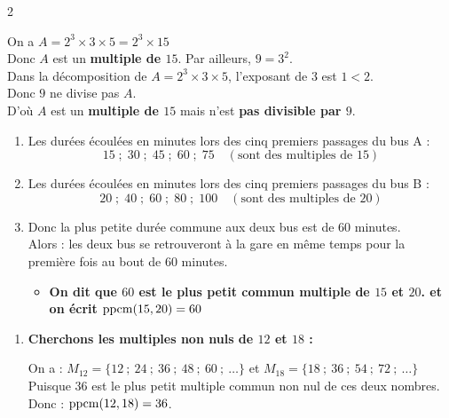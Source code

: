 \documentclass[10pt, a4paper]{article}
\begin{document}
\begin{multicols*}{2}
\begin{Solution}[APPLICATION][9]
\begin{enumerate}[leftmargin=*,itemsep=0.5pt]
    On a $A = 2^3 \times 3 \times 5 = 2^3 \times 15$ \\
    Donc $A$ est un \textbf{multiple de $15$}. Par ailleurs, $9 = 3^2$. \\
    Dans la décomposition de $A = 2^3 \times 3 \times 5$, l'exposant de $3$ est $1 < 2$. \\
    Donc $9$ ne divise pas $A$. \\
    D'où $A$ est un \textbf{multiple de $15$} mais n'est \textbf{pas divisible par $9$}.
\end{enumerate}
\end{Solution}

\begin{Solution}[ACTIVITÉ][4]
\begin{enumerate}[leftmargin=*,itemsep=0.5pt]
    \item Les durées écoulées en minutes lors des cinq premiers passages du bus A :
\[15 \; ; \; 30 \; ; \; 45 \; ; \; 60 \; ; \; 75 \quad (\text{sont des multiples de~} 15) \]

    \item Les durées écoulées en minutes lors des cinq premiers passages du bus B :
\[20 \; ; \; 40 \; ; \; 60 \; ; \; 80 \; ; \; 100 \quad (\text{sont des multiples de~} 20) \]

    \item Donc la plus petite durée commune aux deux bus est de 60 minutes. \\
    Alors : les deux bus se retrouveront à la gare en même temps pour la première fois au bout de 60 minutes.

    \begin{itemize}[label=$\blacktriangleright$, leftmargin=*, nosep]
    \item \textbf{On dit que $60$ est le \textcolor{PrimaryColor}{plus petit commun multiple}  de $15$ et $20$. et on écrit $\operatorname{ppcm}(15, 20) = 60$}
    \end{itemize}
\end{enumerate}
\end{Solution}

\begin{Solution}[APPLICATION][10]
\begin{enumerate}[leftmargin=*,itemsep=0.5pt]
    \item \textbf{Cherchons les multiples non nuls de $12$ et $18$ :}

    On a : $M_{12} = \big\{12~;~24~;~36~;~48~;~60~;~\dots\big\}$
    et $M_{18} = \big\{18~;~36~;~54~;~72~;~\dots\big\}$ \\
    Puisque $36$ est le plus petit multiple commun non nul de ces deux nombres. \\
    Donc : \quad $\operatorname{ppcm}(12, 18) = 36$.


\end{enumerate}
\end{Solution}
\end{multicols*}
\end{document}
